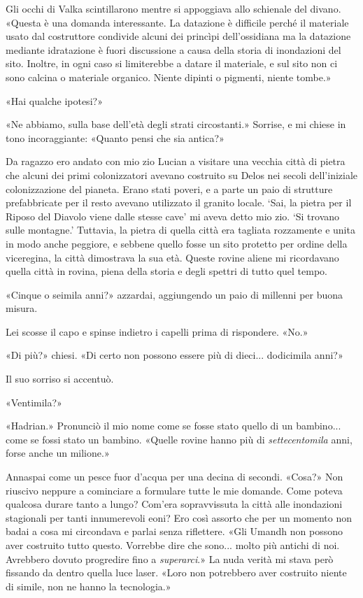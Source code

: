Gli occhi di Valka scintillarono mentre si appoggiava allo schienale del
divano. «Questa è una domanda interessante. La datazione è difficile
perché il materiale usato dal costruttore condivide alcuni dei princìpi
dell'ossidiana ma la datazione mediante idratazione è fuori discussione
a causa della storia di inondazioni del sito. Inoltre, in ogni caso si
limiterebbe a datare il materiale, e sul sito non ci sono calcina o
materiale organico. Niente dipinti o pigmenti, niente tombe.»

«Hai qualche ipotesi?»

«Ne abbiamo, sulla base dell'età degli strati circostanti.» Sorrise, e
mi chiese in tono incoraggiante: «Quanto pensi che sia antica?»

Da ragazzo ero andato con mio zio Lucian a visitare una vecchia città di
pietra che alcuni dei primi colonizzatori avevano costruito su Delos nei
secoli dell'iniziale colonizzazione del pianeta. Erano stati poveri, e a
parte un paio di strutture prefabbricate per il resto avevano utilizzato
il granito locale. `Sai, la pietra per il Riposo del Diavolo viene dalle
stesse cave' mi aveva detto mio zio. `Si trovano sulle montagne.'
Tuttavia, la pietra di quella città era tagliata rozzamente e unita in
modo anche peggiore, e sebbene quello fosse un sito protetto per ordine
della viceregina, la città dimostrava la sua età. Queste rovine aliene
mi ricordavano quella città in rovina, piena della storia e degli
spettri di tutto quel tempo.

«Cinque o seimila anni?» azzardai, aggiungendo un paio di millenni per
buona misura.

Lei scosse il capo e spinse indietro i capelli prima di rispondere.
«No.»

«Di più?» chiesi. «Di certo non possono essere più di dieci...
dodicimila anni?»

Il suo sorriso si accentuò.

«Ventimila?»

«Hadrian.» Pronunciò il mio nome come se fosse stato quello di un
bambino... come se fossi stato un bambino. «Quelle rovine hanno più di
\emph{settecentomila} anni, forse anche un milione.»

Annaspai come un pesce fuor d'acqua per una decina di secondi. «Cosa?»
Non riuscivo neppure a cominciare a formulare tutte le mie domande. Come
poteva qualcosa durare tanto a lungo? Com'era sopravvissuta la città
alle inondazioni stagionali per tanti innumerevoli eoni? Ero così
assorto che per un momento non badai a cosa mi circondava e parlai senza
riflettere. «Gli Umandh non possono aver costruito tutto questo.
Vorrebbe dire che sono... molto più antichi di noi. Avrebbero dovuto
progredire fino a \emph{superarci}.» La nuda verità mi stava però
fissando da dentro quella luce laser. «Loro non potrebbero aver
costruito niente di simile, non ne hanno la tecnologia.»


